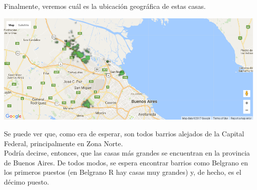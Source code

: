 \documentclass[a4paper, 10pt]{article}
\newcommand\tab[1][0.5cm]{\hspace*{#1}}
\begin{document}
				  	\tab Finalmente, veremos cuál es la ubicación geográfica de estas casas.
				  	\begin{center}
   		    				\includegraphics[width=\textwidth]{images/houseSurfaceTopMap}
				  	\end{center}
				  	\tab Se puede ver que, como era de esperar, son todos barrios alejados de la Capital Federal, principalmente en
				  	Zona Norte. \\
				  	\tab Podría decirse, entonces, que las casas más grandes se encuentran en la provincia de Buenos Aires. De todos
				  	modos, se espera encontrar barrios como Belgrano en los primeros puestos (en Belgrano R hay casas muy grandes) y,
				  	de hecho, es el décimo puesto.
\end{document}
